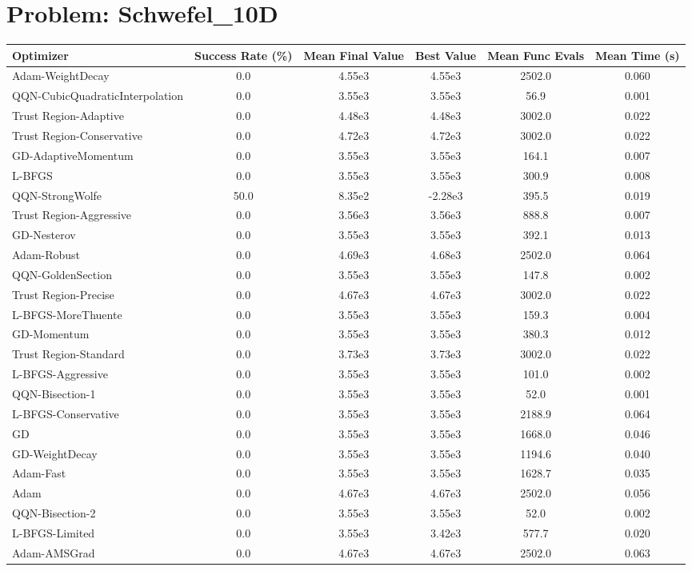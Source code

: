 \documentclass{article}
\begin{document}
\section{Problem: Schwefel\_10D}
\begin{longtable}{p{3cm}*{5}{c}}
\toprule
\textbf{Optimizer} & \textbf{Success Rate (\%)} & \textbf{Mean Final Value} & \textbf{Best Value} & \textbf{Mean Func Evals} & \textbf{Mean Time (s)} \\
\midrule
Adam-WeightDecay & 0.0 & 4.55e3 & 4.55e3 & 2502.0 & 0.060 \\
QQN-CubicQuadraticInterpolation & 0.0 & 3.55e3 & 3.55e3 & 56.9 & 0.001 \\
Trust Region-Adaptive & 0.0 & 4.48e3 & 4.48e3 & 3002.0 & 0.022 \\
Trust Region-Conservative & 0.0 & 4.72e3 & 4.72e3 & 3002.0 & 0.022 \\
GD-AdaptiveMomentum & 0.0 & 3.55e3 & 3.55e3 & 164.1 & 0.007 \\
L-BFGS & 0.0 & 3.55e3 & 3.55e3 & 300.9 & 0.008 \\
QQN-StrongWolfe & 50.0 & 8.35e2 & -2.28e3 & 395.5 & 0.019 \\
Trust Region-Aggressive & 0.0 & 3.56e3 & 3.56e3 & 888.8 & 0.007 \\
GD-Nesterov & 0.0 & 3.55e3 & 3.55e3 & 392.1 & 0.013 \\
Adam-Robust & 0.0 & 4.69e3 & 4.68e3 & 2502.0 & 0.064 \\
QQN-GoldenSection & 0.0 & 3.55e3 & 3.55e3 & 147.8 & 0.002 \\
Trust Region-Precise & 0.0 & 4.67e3 & 4.67e3 & 3002.0 & 0.022 \\
L-BFGS-MoreThuente & 0.0 & 3.55e3 & 3.55e3 & 159.3 & 0.004 \\
GD-Momentum & 0.0 & 3.55e3 & 3.55e3 & 380.3 & 0.012 \\
Trust Region-Standard & 0.0 & 3.73e3 & 3.73e3 & 3002.0 & 0.022 \\
L-BFGS-Aggressive & 0.0 & 3.55e3 & 3.55e3 & 101.0 & 0.002 \\
QQN-Bisection-1 & 0.0 & 3.55e3 & 3.55e3 & 52.0 & 0.001 \\
L-BFGS-Conservative & 0.0 & 3.55e3 & 3.55e3 & 2188.9 & 0.064 \\
GD & 0.0 & 3.55e3 & 3.55e3 & 1668.0 & 0.046 \\
GD-WeightDecay & 0.0 & 3.55e3 & 3.55e3 & 1194.6 & 0.040 \\
Adam-Fast & 0.0 & 3.55e3 & 3.55e3 & 1628.7 & 0.035 \\
Adam & 0.0 & 4.67e3 & 4.67e3 & 2502.0 & 0.056 \\
QQN-Bisection-2 & 0.0 & 3.55e3 & 3.55e3 & 52.0 & 0.002 \\
L-BFGS-Limited & 0.0 & 3.55e3 & 3.42e3 & 577.7 & 0.020 \\
Adam-AMSGrad & 0.0 & 4.67e3 & 4.67e3 & 2502.0 & 0.063 \\
\bottomrule
\end{longtable}
\end{document}
